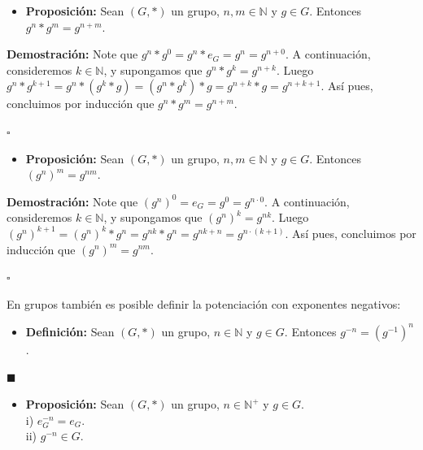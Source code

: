 \documentclass[10 pt]{article}
\begin{document}
\begin{itemize}
    \item \Large{\textbf{Proposición:} Sean $(G,*)$ un grupo, $n,m \in \mathbb N$ y $g \in G$. Entonces $g^n*g^m=g^{n+m}$.} \\
\end{itemize}

\Large{\textbf{Demostración:} Note que $g^n*g^0=g^n*e_G=g^n=g^{n+0}$. A continuación, consideremos $k \in \mathbb N$, y supongamos que $g^n*g^k=g^{n+k}$. Luego $g^{n}*g^{k+1}=g^n*(g^k*g)=(g^n*g^k)*g=g^{n+k}*g=g^{n+k+1}$. Así pues, concluimos por inducción que $g^n*g^m=g^{n+m}$.} \\

\begin{flushright}
    $\square$
\end{flushright}

\begin{itemize}
    \item \Large{\textbf{Proposición:} Sean $(G,*)$ un grupo, $n,m \in \mathbb N$ y $g \in G$. Entonces $(g^n)^m=g^{nm}$.} \\
\end{itemize}

\Large{\textbf{Demostración:} Note que $(g^n)^0=e_G=g^{0}=g^{n \cdot 0}$. A continuación, consideremos $k \in \mathbb N$, y supongamos que $(g^n)^k=g^{nk}$. Luego $(g^{n})^{k+1}=(g^{n})^k*g^n=g^{nk}*g^n=g^{nk+n}=g^{n \cdot (k+1)}$. Así pues, concluimos por inducción que $(g^n)^m=g^{nm}$.} \\

\begin{flushright}
    $\square$
\end{flushright}

\Large{En grupos también es posible definir la potenciación con exponentes negativos:} \\

\begin{itemize}
    \item \Large{\textbf{Definición:} Sean $(G,*)$ un grupo, $n \in \mathbb N$ y $g \in G$. Entonces $g^{-n}=(g^{-1})^n$.} \\
\end{itemize}

\begin{flushright}
    $\blacksquare$
\end{flushright}

\begin{itemize}
    \item \Large{\textbf{Proposición:} Sean $(G,*)$ un grupo, $n \in \mathbb N^+$ y $g \in G$. \\

    i) $e_G^{-n}=e_G$. \\

    ii) $g^{-n} \in G$.} \\
\end{itemize}
\end{document}
